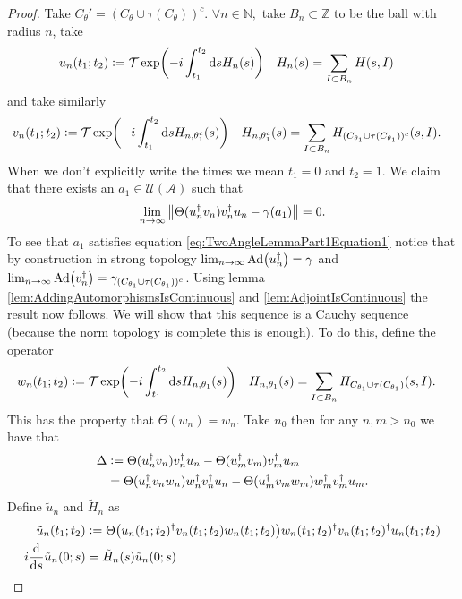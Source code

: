 \documentclass[12pt,a4paper,twoside]{article}
\renewcommand{\d}{\text{d}}
\newcommand{\defeq}{\vcentcolon=}
\let\originalleft\left
\let\originalright\right
\renewcommand{\left}{\mathopen{}\mathclose\bgroup\originalleft}
\renewcommand{\right}{\aftergroup\egroup\originalright}
\newcommand{\UU}{\mathcal U}
\newcommand{\ZZ}{\mathbb Z}
\renewcommand{\AA}{\mathcal A}
\newcommand{\NN}{\mathbb{N}}
\newcommand{\Ad}[1]{\textrm{Ad}\left(#1\right)}
\theoremstyle{definition}
\numberwithin{equation}{section}
\begin{document}
\begin{proof}
	Take $C_\theta'=(C_\theta\cup\tau(C_\theta))^c.$ $\forall n\in\NN,$ take $B_n\subset\ZZ$ to be the ball with radius $n$, take
	\begin{align}
		u_n(t_1;t_2)&\defeq \mathcal{T}\exp(-i\int_{t_1}^{t_2} \d s H_n(s))&H_n(s)&=\sum_{I\subset B_n}H(s,I)
	\end{align}
	and take similarly
	\begin{align}
		v_n(t_1;t_2)&\defeq \mathcal{T}\exp(-i\int_{t_1}^{t_2} \d s H_{n,\theta_1^c}(s) )&H_{n,\theta_1^c}(s)&=\sum_{I\subset B_n}H_{(C_{\theta_1}\cup \tau(C_{\theta_1}))^c}(s,I).
	\end{align}
	When we don't explicitly write the times we mean $t_1=0$ and $t_2=1$. We claim that there exists an $a_1\in\UU(\AA)$ such that
	\begin{equation}
		\lim_{n\rightarrow\infty}\norm{\Theta(u_n^\dagger v_n)v_n^\dagger u_n-\gamma(a_1)}=0.
	\end{equation}
	To see that $a_1$ satisfies equation \eqref{eq:TwoAngleLemmaPart1Equation1} notice that by construction in strong topology $\lim_{n\rightarrow\infty}\Ad{u_n^\dagger}=\gamma$ and $\lim_{n\rightarrow\infty}\Ad{v_n^\dagger}=\gamma_{(C_{\theta_1}\cup \tau(C_{\theta_1}))^c}$. Using lemma \ref{lem:AddingAutomorphismsIsContinuous} and \ref{lem:AdjointIsContinuous} the result now follows. We will show that this sequence is a Cauchy sequence (because the norm topology is complete this is enough). To do this, define the operator
	\begin{align}
		w_n(t_1;t_2)&\defeq \mathcal{T}\exp(-i\int_{t_1}^{t_2} \d s H_{n,\theta_1}(s))&H_{n,\theta_1}(s)&=\sum_{I\subset B_n}H_{C_{\theta_1}\cup \tau(C_{\theta_1})}(s,I).
	\end{align}
	This has the property that $\Theta(w_n)=w_n$. Take $n_0$ then for any $n,m>n_0$ we have that
	\begin{align}
		\Delta&\defeq\Theta(u_n^\dagger v_n)v_n^\dagger u_n-\Theta(u_m^\dagger v_m)v_m^\dagger u_m\\
		&=\Theta(u_n^\dagger v_n w_n)w_n^\dagger v_n^\dagger u_n -\Theta(u_m^\dagger v_m w_m)w_m^\dagger v_m^\dagger u_m.
	\end{align}
	Define $\tilde{u}_n$ and $\tilde{H}_n$ as
	\begin{align}
		\tilde{u}_n(t_1;t_2)&\defeq \Theta\left(u_n(t_1;t_2)^\dagger v_n(t_1;t_2) w_n(t_1;t_2)\right)w_n(t_1;t_2)^\dagger v_n(t_1;t_2)^\dagger u_n(t_1;t_2)\\
		i\frac{\d}{\d s}\tilde{u}_n(0;s)&=\tilde{H}_n(s)\tilde{u}_n(0;s)

\end{align}
\end{proof}
\end{document}
